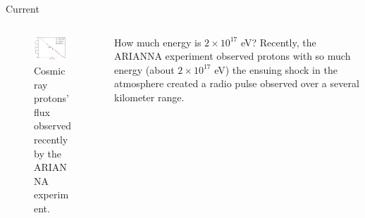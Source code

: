 \documentclass{beamer}
\begin{document}
\begin{frame}{Current}
\begin{columns}[T]
\begin{column}{0.5\textwidth}
\begin{figure}
\centering
\includegraphics[width=0.9\textwidth]{figures/ARIANNA1.png}
\caption{\label{fig:ARIANNA1} Cosmic ray protons' flux observed recently by the ARIANNA experiment.}
\end{figure}
\end{column}
\begin{column}{0.5\textwidth}
\small
How much energy is $2 \times 10^{17}$ eV?  Recently, the ARIANNA experiment observed protons with so much energy (about $2 \times 10^{17}$ eV) the ensuing shock in the atmosphere created a radio pulse observed over a several kilometer range.
\end{column}
\end{columns}
\end{frame}
\end{document}
